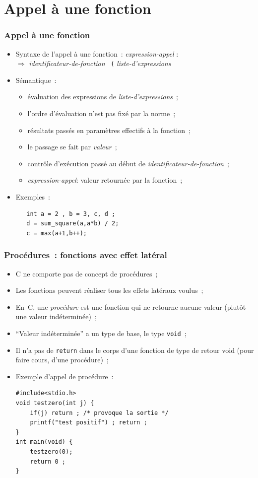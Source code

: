 \section{Appel \`a une fonction}
\begin{frame}[fragile]
\frametitle{Appel \`a une fonction}
\begin{itemize}
\item Syntaxe de l'appel \`a une fonction~:
{\it expression-appel} :\\
\quad $\Rightarrow$  {\it identificateur-de-fonction} 
\, {\tt (} \; {\it liste-d'expressions} \;{\tt )}
\item S\'{e}mantique~:
  \begin{itemize}
    \item \'evaluation des expressions de {\it liste-d'expressions}~;
    \item l'ordre d'\'evaluation n'est pas fix\'e par la norme~;
    \item r\'esultats pass\'es en param\`etres effectifs \`a la fonction~;
    \item le passage se fait par {\em valeur}~;
    \item contr\^ole d'ex\'ecution pass\'e au d\'ebut de {\it
        identificateur-de-fonction}~;
    \item{\it expression-appel}: valeur retourn\'ee par la fonction~;  
  \end{itemize}
\item Exemples~:
\begin{verbatim}
   int a = 2 , b = 3, c, d ;
   d = sum_square(a,a*b) / 2; 
   c = max(a+1,b++); 
\end{verbatim}
\end{itemize}
\end{frame}
\begin{frame}[fragile]
  \frametitle{Proc\'edures~: fonctions avec effet lat\'eral}
  \begin{itemize}
  \item C ne comporte pas de concept de proc\'edures~;
  \item Les fonctions peuvent r\'ealiser tous les effets lat\'eraux voulus~;
  \item En~C, une \textit{proc\'edure} est une fonction qui ne retourne
    aucune valeur (plut\^ot une valeur ind\'etermin\'ee)~;
  \item ``Valeur ind\'etermin\'ee'' a un type de base, le type {\tt void}~; 
  \item Il n'a pas de {\tt return} dans le corps d'une fonction de
    type de retour void (pour faire cours, d'une proc\'edure)~;
  \item Exemple d'appel de proc\'edure~:
\begin{verbatim}
#include<stdio.h>
void testzero(int j) {
	if(j) return ; /* provoque la sortie */
	printf("test positif") ; return ;
}
int main(void) {	
	testzero(0);
	return 0 ;
}
\end{verbatim}
  \end{itemize}
\end{frame}
